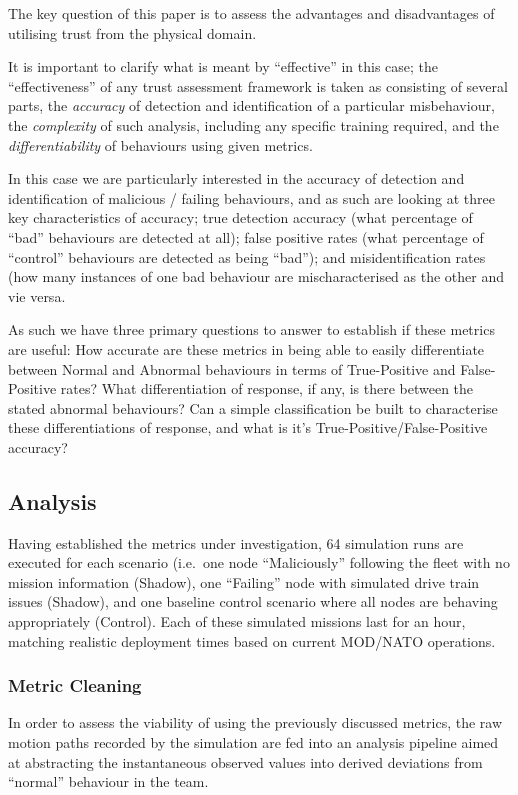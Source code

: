 \documentclass[conference,compsoc,letterpaper]{IEEEtran}
\begin{document}
The key question of this paper is to assess the advantages and disadvantages of utilising trust from the physical domain. 

It is important to clarify what is meant by ``effective'' in this case; the ``effectiveness'' of any trust assessment framework is taken as consisting of several parts, the \emph{accuracy} of detection and identification of a particular misbehaviour, the \emph{complexity} of such analysis, including any specific training required, and the \emph{differentiability} of behaviours using given metrics.

In this case we are particularly interested in the accuracy of detection and identification of malicious / failing behaviours, and as such are looking at three key characteristics of accuracy; true detection accuracy (what percentage of ``bad'' behaviours are detected at all); false positive rates (what percentage of ``control'' behaviours are detected as being ``bad''); and misidentification rates (how many instances of one bad behaviour are mischaracterised as the other and vie versa.

As such we have three primary questions to answer to establish if these metrics are useful: 
How accurate are these metrics in being able to easily differentiate between Normal and Abnormal behaviours in terms of True-Positive and False-Positive rates?
What differentiation of response, if any, is there between the stated abnormal behaviours?
Can a simple classification be built to characterise these differentiations of response, and what is it's True-Positive/False-Positive accuracy?


\subsection{Analysis}
Having established the metrics under investigation, 64 simulation runs are executed for each scenario (i.e.\ one node ``Maliciously'' following the fleet with no mission information (Shadow), one ``Failing'' node with simulated drive train issues (Shadow), and one baseline control scenario where all nodes are behaving appropriately (Control).
Each of these simulated missions last for an hour, matching realistic deployment times based on current MOD/NATO operations\cite{Bolster2014a}.

\subsubsection{Metric Cleaning}
In order to assess the viability of using the previously discussed metrics, the raw motion paths recorded by the simulation are fed into an analysis pipeline aimed at abstracting the instantaneous observed values into derived deviations from ``normal'' behaviour in the team.
\end{document}
